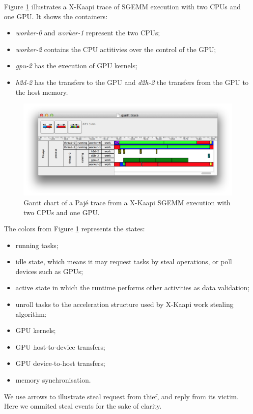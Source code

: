 \documentclass{article}[12pt]
\newcommand{\kaapi}{\textsc{X}-Kaapi\xspace}
\begin{document}
Figure \ref{fig:trace} illustrates a \kaapi trace of SGEMM execution with two CPUs and one GPU.
It shows the containers:
\begin{itemize}
\item \textit{worker-0} and \textit{worker-1} represent the two CPUs;
\item \textit{worker-2} contains the CPU actitivies over the control of the GPU;
\item \textit{gpu-2} has the execution of GPU kernels;
\item \textit{h2d-2} has the transfers to the GPU and \textit{d2h-2} the transfers from the GPU to the host memory.
\end{itemize}
\begin{figure}[htb]
\centering
\includegraphics[scale=0.6]{sgemm-paje-trace.png}
\caption{
Gantt chart of a Paj\'e trace from a \kaapi SGEMM execution with two CPUs and one GPU.
}
\label{fig:trace}
\end{figure}


The colors from Figure \ref{fig:trace} represents the states:
\begin{itemize}
\item \textcolor{running}{running} tasks;
\item \textcolor{idle}{idle} state, which means it may request tasks by steal operations, or poll devices such as GPUs;
\item \textcolor{active}{active} state in which the runtime performs other activities as data validation;
\item \textcolor{unroll}{unroll} tasks to the acceleration structure used by \kaapi work stealing algorithm;
\item GPU \textcolor{kernel}{kernels};
\item GPU \textcolor{host2device}{host-to-device} transfers;
\item GPU \textcolor{device2host}{device-to-host} transfers;
\item memory \textcolor{sync}{synchronisation}.
\end{itemize}

We use arrows to illustrate steal request from thief, and reply from its victim. Here we ommited steal events for the sake of clarity.
\end{document}
